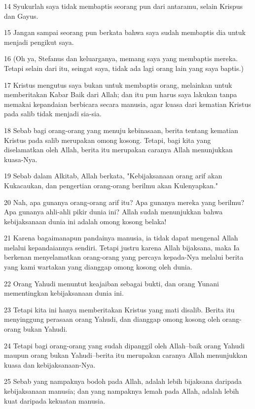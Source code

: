 \par 14 Syukurlah saya tidak membaptis seorang pun dari antaramu, selain Krispus dan Gayus.
\par 15 Jangan sampai seorang pun berkata bahwa saya sudah membaptis dia untuk menjadi pengikut saya.
\par 16 (Oh ya, Stefanus dan keluarganya, memang saya yang membaptis mereka. Tetapi selain dari itu, seingat saya, tidak ada lagi orang lain yang saya baptis.)
\par 17 Kristus mengutus saya bukan untuk membaptis orang, melainkan untuk memberitakan Kabar Baik dari Allah; dan itu pun harus saya lakukan tanpa memakai kepandaian berbicara secara manusia, agar kuasa dari kematian Kristus pada salib tidak menjadi sia-sia.
\par 18 Sebab bagi orang-orang yang menuju kebinasaan, berita tentang kematian Kristus pada salib merupakan omong kosong. Tetapi, bagi kita yang diselamatkan oleh Allah, berita itu merupakan caranya Allah menunjukkan kuasa-Nya.
\par 19 Sebab dalam Alkitab, Allah berkata, "Kebijaksanaan orang arif akan Kukacaukan, dan pengertian orang-orang berilmu akan Kulenyapkan."
\par 20 Nah, apa gunanya orang-orang arif itu? Apa gunanya mereka yang berilmu? Apa gunanya ahli-ahli pikir dunia ini? Allah sudah menunjukkan bahwa kebijaksanaan dunia ini adalah omong kosong belaka!
\par 21 Karena bagaimanapun pandainya manusia, ia tidak dapat mengenal Allah melalui kepandaiannya sendiri. Tetapi justru karena Allah bijaksana, maka Ia berkenan menyelamatkan orang-orang yang percaya kepada-Nya melalui berita yang kami wartakan yang dianggap omong kosong oleh dunia.
\par 22 Orang Yahudi menuntut keajaiban sebagai bukti, dan orang Yunani mementingkan kebijaksanaan dunia ini.
\par 23 Tetapi kita ini hanya memberitakan Kristus yang mati disalib. Berita itu menyinggung perasaan orang Yahudi, dan dianggap omong kosong oleh orang-orang bukan Yahudi.
\par 24 Tetapi bagi orang-orang yang sudah dipanggil oleh Allah--baik orang Yahudi maupun orang bukan Yahudi--berita itu merupakan caranya Allah menunjukkan kuasa dan kebijaksanaan-Nya.
\par 25 Sebab yang nampaknya bodoh pada Allah, adalah lebih bijaksana daripada kebijaksanaan manusia; dan yang nampaknya lemah pada Allah, adalah lebih kuat daripada kekuatan manusia.

